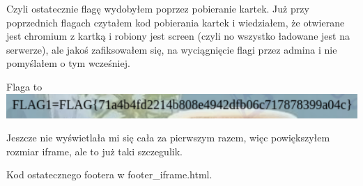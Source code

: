 \documentclass{article}
\begin{document}
Czyli ostatecznie flagę wydobyłem poprzez pobieranie kartek. 
Już przy poprzednich flagach czytałem kod pobierania kartek i wiedziałem, że otwierane jest chromium z kartką i robiony jest screen (czyli no wszystko ładowane jest na serwerze), ale jakoś zafiksowałem się, na wyciągnięcie flagi przez admina i nie pomyślałem o tym wcześniej.

Flaga to \includegraphics{flag3.png}

Jeszcze nie wyświetlała mi się cała za pierwszym razem, więc powiększyłem rozmiar iframe, ale to już taki szczegulik.

Kod ostatecznego footera w footer\_iframe.html.
\end{document}
